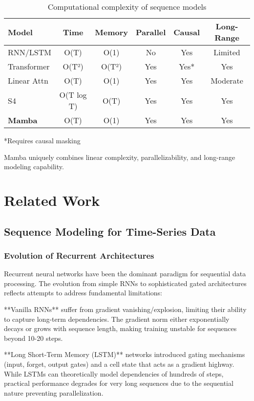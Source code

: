 \documentclass[10pt,journal,compsoc]{IEEEtran}
\begin{document}
\begin{table}[h]
\centering
\caption{Computational complexity of sequence models}
\label{tab:model_comparison}
\begin{tabular}{lccccc}
\toprule
Model & Time & Memory & Parallel & Causal & Long-Range \\
\midrule
RNN/LSTM & O(T) & O(1) & No & Yes & Limited \\
Transformer & O(T²) & O(T²) & Yes & Yes* & Yes \\
Linear Attn & O(T) & O(1) & Yes & Yes & Moderate \\
S4 & O(T log T) & O(T) & Yes & Yes & Yes \\
\textbf{Mamba} & O(T) & O(1) & Yes & Yes & Yes \\
\bottomrule
\end{tabular}
\end{table}
*Requires causal masking

Mamba uniquely combines linear complexity, parallelizability, and long-range modeling capability.

\section{Related Work}
\label{sec:related_work}

\subsection{Sequence Modeling for Time-Series Data}

\subsubsection{Evolution of Recurrent Architectures}

Recurrent neural networks have been the dominant paradigm for sequential data processing. The evolution from simple RNNs to sophisticated gated architectures reflects attempts to address fundamental limitations:

**Vanilla RNNs** suffer from gradient vanishing/explosion, limiting their ability to capture long-term dependencies. The gradient norm either exponentially decays or grows with sequence length, making training unstable for sequences beyond 10-20 steps.

**Long Short-Term Memory (LSTM)** networks \cite{hochreiter1997long} introduced gating mechanisms (input, forget, output gates) and a cell state that acts as a gradient highway. While LSTMs can theoretically model dependencies of hundreds of steps, practical performance degrades for very long sequences due to the sequential nature preventing parallelization.
\end{document}
